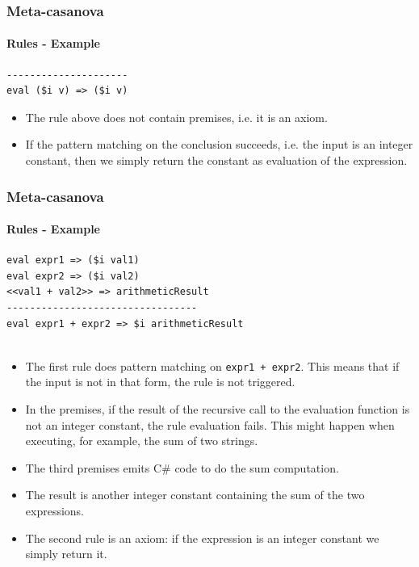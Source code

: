 \documentclass[mathserif,serif]{beamer}
\begin{document}
\begin{frame}[fragile]
	\frametitle{Meta-casanova}
	\framesubtitle{Rules - Example}
	
	\begin{lstlisting}
---------------------
eval ($i v) => ($i v)
	\end{lstlisting}
	
	\begin{itemize}
		\item The rule above does not contain premises, i.e. it is an axiom.
		\item If the pattern matching on the conclusion succeeds, i.e. the input is an integer constant, then we simply return the constant as evaluation of the expression.
	\end{itemize}

\end{frame}

\begin{frame}[fragile]
	\frametitle{Meta-casanova}
	\framesubtitle{Rules - Example}
	
		\begin{lstlisting}
eval expr1 => ($i val1)
eval expr2 => ($i val2)
<<val1 + val2>> => arithmeticResult
---------------------------------
eval expr1 + expr2 => $i arithmeticResult


	\end{lstlisting}
	
	\begin{itemize}
		\item The first rule does pattern matching on \texttt{expr1 + expr2}. This means that if the input is not in that form, the rule is not triggered.
		\item In the premises, if the result of the recursive call to the evaluation function is not an integer constant, the rule evaluation fails. This might happen when executing, for example, the sum of two strings.
		\item The third premises emits C\# code to do the sum computation.
		\item The result is another integer constant containing the sum of the two expressions.
		\item The second rule is an axiom: if the expression is an integer constant we simply return it.
	\end{itemize}

\end{frame}
\end{document}
